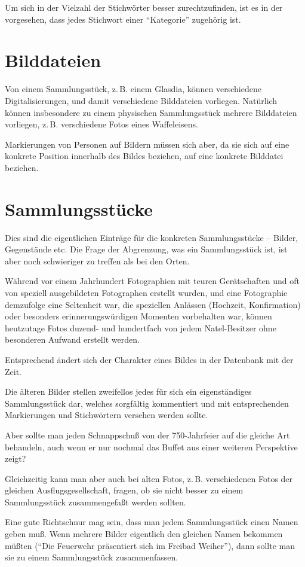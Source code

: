 \documentclass[12pt]{scrreprt}
\begin{document}
Um sich in der Vielzahl der Stichwörter besser zurechtzufinden, ist es
in der \DB{} vorgesehen, dass jedes Stichwort einer ``Kategorie''
zugehörig ist.


\section{Bilddateien} Von einem Sammlungsstück, z.\,B. einem Glasdia, können
verschiedene Digitalisierungen, und damit verschiedene Bilddateien
vorliegen. Natürlich können insbesondere zu einem physischen
Sammlungsstück mehrere Bilddateien vorliegen, z.\,B. verschiedene Fotos
eines Waffeleisens.

Markierungen von Personen auf Bildern müssen sich aber, da sie sich
auf eine konkrete Position innerhalb des Bildes beziehen, auf eine
konkrete Bilddatei beziehen.

\section{Sammlungsstücke} Dies sind die eigentlichen Einträge für die konkreten
Sammlungsstücke -- Bilder, Gegenstände etc. Die Frage der Abgrenzung, was
ein Sammlungsstück ist, ist aber noch schwieriger zu treffen als bei den Orten.

Während vor einem Jahrhundert Fotographien mit teuren Gerätschaften
und oft von speziell ausgebildeten Fotographen erstellt wurden, und
eine Fotographie demzufolge eine Seltenheit war, die speziellen
Anlässen (Hochzeit, Konfirmation) oder besonders erinnerungswürdigen
Momenten vorbehalten war, können heutzutage Fotos duzend- und
hundertfach von jedem Natel-Besitzer ohne besonderen Aufwand erstellt
werden.

Entsprechend ändert sich der Charakter eines Bildes in der Datenbank
mit der Zeit.

Die älteren Bilder stellen zweifellos jedes für sich ein
eigenständiges Sammlungsstück dar, welches sorgfältig kommentiert und
mit entsprechenden Markierungen und Stichwörtern versehen werden
sollte.

Aber sollte man jeden Schnappschuß von der 750-Jahrfeier auf die
gleiche Art behandeln, auch wenn er nur nochmal das Buffet aus einer
weiteren Perspektive zeigt?

Gleichzeitig kann man aber auch bei alten Fotos, z.\,B. verschiedenen
Fotos der gleichen Ausflugsgesellschaft, fragen, ob sie nicht besser
zu einem Sammlungsstück zusammengefaßt werden sollten.

Eine gute Richtschnur mag sein, dass man jedem Sammlungsstück einen
Namen geben muß. Wenn mehrere Bilder eigentlich den gleichen Namen
bekommen müßten (``Die Feuerwehr präsentiert sich im Freibad Weiher''),
dann sollte man sie zu einem Sammlungsstück zusammenfassen.
\end{document}
